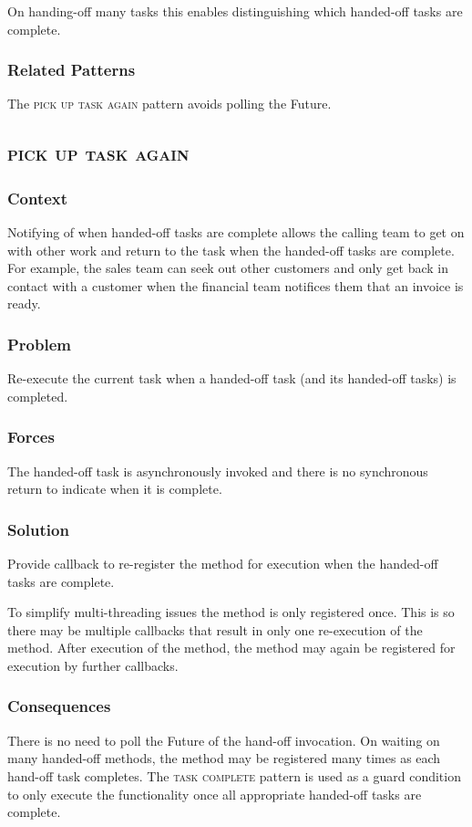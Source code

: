 \documentclass[prodmode]{style/acmlarge}
\begin{document}
On handing-off many tasks this enables distinguishing which handed-off tasks are
complete.

\subsubsection*{Related Patterns} The \textsc{pick up task again} pattern avoids
polling the Future.



\subsection{\textsc{\textbf{pick up task again}}}

\subsubsection*{Context} Notifying of when handed-off tasks are complete allows
the calling team to get on with other work and return to the task when the
handed-off tasks are complete.  For example, the sales team can seek out other
customers and only get back in contact with a customer when the financial team
notifices them that an invoice is ready.

\subsubsection*{Problem} Re-execute the current task when a handed-off task (and
its handed-off tasks) is completed.

\subsubsection*{Forces} The handed-off task is asynchronously invoked and there is
no synchronous return to indicate when it is complete.

\subsubsection*{Solution} Provide callback to re-register the method for
execution when the handed-off tasks are complete.

To simplify multi-threading issues the method is only registered once.  This is
so there may be multiple callbacks that result in only one re-execution of the
method. After execution of the method, the method may again be registered for
execution by further callbacks.

\subsubsection*{Consequences} There is no need to poll the Future of the
hand-off invocation.  On waiting on many handed-off methods, the method may be
registered many times as each hand-off task completes.  The \textsc{task
complete} pattern is used as a guard condition to only execute the functionality
once all appropriate handed-off tasks are complete.
\end{document}
